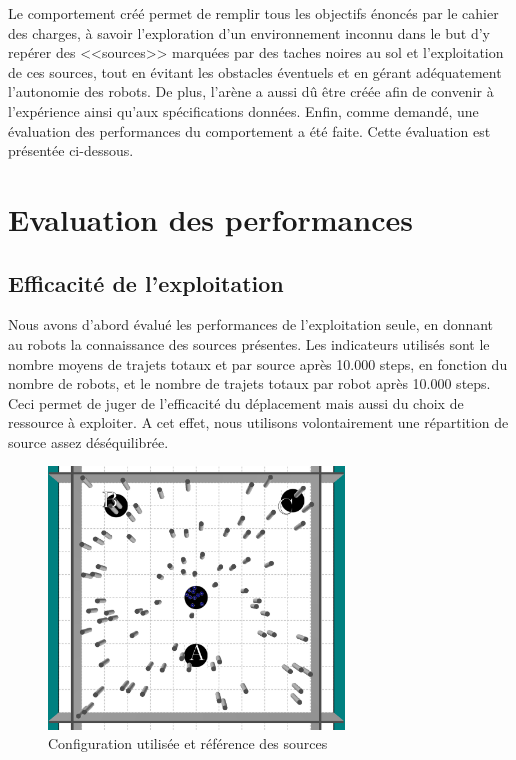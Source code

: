 Le comportement créé permet de remplir tous les objectifs énoncés par le cahier des charges, à savoir l'exploration d'un environnement inconnu dans le but d'y repérer des <<sources>> marquées par des taches noires au sol et l'exploitation de ces sources, tout en évitant les obstacles éventuels et en gérant adéquatement l'autonomie des robots. De plus, l'arène a aussi dû être créée afin de convenir à l'expérience ainsi qu'aux spécifications données. Enfin, comme demandé, une évaluation des performances du comportement a été faite. Cette évaluation est présentée ci-dessous.

\section{Evaluation des performances}

\subsection{Efficacité de l'exploitation}

Nous avons d'abord évalué les performances de l'exploitation seule, en donnant au robots la connaissance des sources présentes. Les indicateurs utilisés sont le nombre moyens de trajets totaux et par source après 10.000 steps, en fonction du nombre de robots, et le nombre de trajets totaux par robot après 10.000 steps. Ceci permet de juger de l'efficacité du déplacement mais aussi du choix de ressource à exploiter. A cet effet, nous utilisons volontairement une répartition de source assez déséquilibrée.
\begin{figure}[htbp]
  \centering
  \includegraphics[width=0.7\textwidth]{pics/initArenaNames.png}
  \caption{Configuration utilisée et référence des sources}
\end{figure}

